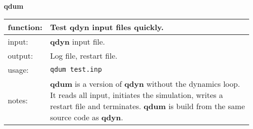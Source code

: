 \documentclass[a4paper,10pt]{article}
\begin{document}
\textbf{qdum}\\
\begin{tabularx}{\textwidth}{|l|X|}
\hline
 function: &   Test \textbf{qdyn} input files quickly.\\\hline
 input:    &   \textbf{qdyn} input file.\\\hline
 output:   &   Log file, restart file.\\\hline
 usage:    &   \verb"qdum test.inp"\\\hline
 notes:    &   \textbf{qdum} is a version of \textbf{qdyn} without the dynamics loop. It reads all input, initiates the
               simulation, writes a restart file and terminates. \textbf{qdum} is build from the same source
               code as \textbf{qdyn}.\\
\hline
\end{tabularx}

\newpage
\end{document}
